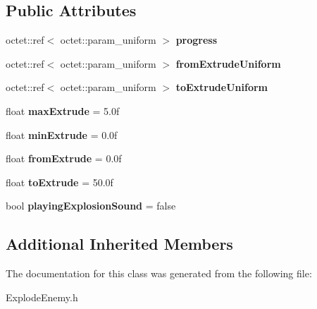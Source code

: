 \subsection*{Public Attributes}
\begin{DoxyCompactItemize}
\item 
\hypertarget{class_arena_1_1_explode_enemy_ab413b82aea25e5868c3c1eb9a03fe7c1}{octet\+::ref$<$ octet\+::param\+\_\+uniform $>$ {\bfseries progress}}\label{class_arena_1_1_explode_enemy_ab413b82aea25e5868c3c1eb9a03fe7c1}

\item 
\hypertarget{class_arena_1_1_explode_enemy_a94550b553e81f561cd4a9d04cf4e7ea7}{octet\+::ref$<$ octet\+::param\+\_\+uniform $>$ {\bfseries from\+Extrude\+Uniform}}\label{class_arena_1_1_explode_enemy_a94550b553e81f561cd4a9d04cf4e7ea7}

\item 
\hypertarget{class_arena_1_1_explode_enemy_a00a58032757c138911d447150ed2a38a}{octet\+::ref$<$ octet\+::param\+\_\+uniform $>$ {\bfseries to\+Extrude\+Uniform}}\label{class_arena_1_1_explode_enemy_a00a58032757c138911d447150ed2a38a}

\item 
\hypertarget{class_arena_1_1_explode_enemy_af0062234298899a2a6deefaf39d45cc3}{float {\bfseries max\+Extrude} = 5.\+0f}\label{class_arena_1_1_explode_enemy_af0062234298899a2a6deefaf39d45cc3}

\item 
\hypertarget{class_arena_1_1_explode_enemy_ad75790f6d02f7168649e389a6a6b149e}{float {\bfseries min\+Extrude} = 0.\+0f}\label{class_arena_1_1_explode_enemy_ad75790f6d02f7168649e389a6a6b149e}

\item 
\hypertarget{class_arena_1_1_explode_enemy_a778ccd23f8cdd75715df880de41aef82}{float {\bfseries from\+Extrude} = 0.\+0f}\label{class_arena_1_1_explode_enemy_a778ccd23f8cdd75715df880de41aef82}

\item 
\hypertarget{class_arena_1_1_explode_enemy_aaf74235fe3c0db86c4570955771046e8}{float {\bfseries to\+Extrude} = 50.\+0f}\label{class_arena_1_1_explode_enemy_aaf74235fe3c0db86c4570955771046e8}

\item 
\hypertarget{class_arena_1_1_explode_enemy_afbfe6fe46661a838a8ef6d3efe60d3a4}{bool {\bfseries playing\+Explosion\+Sound} = false}\label{class_arena_1_1_explode_enemy_afbfe6fe46661a838a8ef6d3efe60d3a4}

\end{DoxyCompactItemize}
\subsection*{Additional Inherited Members}


The documentation for this class was generated from the following file\+:\begin{DoxyCompactItemize}
\item 
Explode\+Enemy.\+h\end{DoxyCompactItemize}
